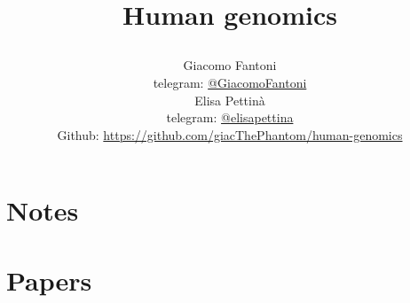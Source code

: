 

\title{\Huge\textbf{{Human genomics}}

\author{
  Giacomo Fantoni \\
  \small telegram: \href{https://t.me/GiacomoFantoni}{@GiacomoFantoni} \\[3pt]
  Elisa Pettin\`a \\
  \small telegram: \href{https://t.me/elisapettina}{@elisapettina} \\[3pt]
\small Github: \href{https://github.com/giacThePhantom/human-genomics}{https://github.com/giacThePhantom/human-genomics}
}
}


\maketitle
\tableofcontents

  \part{Notes}
    
   
    
    
    
    
    
    
   
    



  \part{Papers}
    
    
   
    
   
    
   



